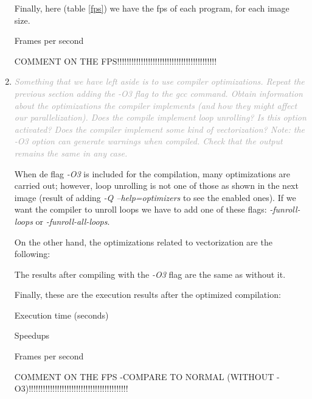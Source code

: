 \documentclass{article}
\newcommand{\greyItem}[1]{\item\emph{\textcolor{darkgray}{#1}}}
\begin{document}
\begin{enumerate}[label=5.\arabic*,leftmargin=*]
\pagebreak

Finally, here (table \ref{fps}) we have the fps of each program, for each image size.

\begin{table}[h]
    
    \centering
    \caption{Frames per second}
    \label{fps}
\end{table}

COMMENT ON THE FPS!!!!!!!!!!!!!!!!!!!!!!!!!!!!!!!!!!!!!!!!!!

\pagebreak

\greyItem{Something that we have left aside is to use compiler optimizations. Repeat the previous section adding the -O3 flag to the gcc command. Obtain information about the optimizations the compiler implements (and how they might affect our parallelization). Does the compile implement loop unrolling? Is this option activated? Does the compiler implement some kind of vectorization? Note: the -O3 option can generate warnings when compiled. Check that the output remains the same in any case.}


When de flag \emph{-O3} is included for the compilation, many optimizations are carried out; however, loop unrolling is not one of those as shown in the next image (result of adding \emph{-Q --help=optimizers} to see the enabled ones). If we want the compiler to unroll loops we have to add one of these flags: \emph{-funroll-loops} or \emph{-funroll-all-loops}. 



On the other hand, the optimizations related to vectorization are the following:



The results after compiling with the \emph{-O3} flag are the same as without it.

Finally, these are the execution results after the optimized compilation:

\begin{table}[h]
    
    \centering
    \caption{Execution time (seconds)}
\end{table}

\begin{table}[h]
    
    \centering
    \caption{Speedups}
\end{table}


\begin{table}[h]
    
    \centering
    \caption{Frames per second}
    \label{fps}
\end{table}


COMMENT ON THE FPS -COMPARE TO NORMAL (WITHOUT -O3)!!!!!!!!!!!!!!!!!!!!!!!!!!!!!!!!!!!!!!!!!!

\end{enumerate}
\end{document}
